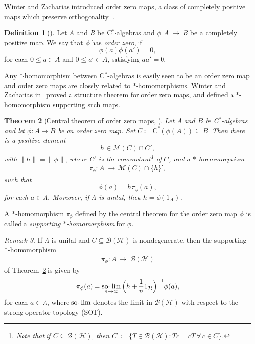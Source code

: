 \documentclass[a4paper]{amsart}
\newcommand{\myhyp}{\textnormal{-}\hskip0pt\relax}
\numberwithin{equation}{section}
\newcommand{\Bcal}{\mathcal{B}}
\newcommand{\Hcal}{\mathcal{H}}
\newcommand{\Mcal}{\mathcal{M}}
\newcommand{\multAlg}[1]{\Mcal({#1})}
\newcommand{\cstar}{C$^\ast$\myhyp{}algebra}
\newcommand{\calg}[1]{\mathrm{C}^\ast({#1})}
\newcommand{\bop}[1]{\Bcal({#1})}
\newcommand{\rAr}{\longrightarrow}
\DeclareMathOperator{\solim}{\mathrm{so\myhyp{}}\lim}
\newcommand{\normreg}[1]{{\lVert #1  \rVert}}
\theoremstyle{plain}
\newtheorem{thm}{Theorem}[section]
\theoremstyle{indented}
\numberwithin{equation}{section}
\theoremstyle{definition}
\newtheorem{defin}[thm]{Definition}
\theoremstyle{remark}
\newtheorem{rmk}[thm]{Remark}
\theoremstyle{plain}
\theoremstyle{definition}
\begin{document}
Winter and Zacharias introduced order zero maps, a class of completely positive maps 
which preserve orthogonality~\cite{WinterZacharias2009orderZero}. 
\begin{defin}[{\cite[Definition~2.3]{WinterZacharias2009orderZero}}]
    Let $A$ and $B$ be \cstar{}s and ${\phi \colon A~\rAr~B}$ be a completely positive map. 
    We say that $\phi$ has \emph{order zero}, if
    \[\phi(a) \phi(a') =0,\]
    for each $0 \le a \in A$ and $0 \le  a' \in A$, satisfying $a a' =0$.
    
\end{defin}

Any $\ast$\myhyp{}homomorphism between \cstar{}s
is easily seen to be an order zero map and 
order zero maps are closely related to $\ast$\myhyp{}homomorphisms. 
Winter and Zacharias in~\cite{WinterZacharias2009orderZero} proved a structure theorem for order zero maps, and defined a $\ast$\myhyp{}homomorphism supporting such maps.

\begin{thm}[Central theorem of order zero maps, {\cite[Theorem~3.3]{WinterZacharias2009orderZero}}] \label{thm:orderZero}
    Let $A$ and $B$ be \cstar{}s and let ${\phi \colon A \rAr B}$ be an order zero map. 
    Set ${C\coloneq \calg{\phi(A)}\subseteq B}$. 
    Then there is a positive element 
    \[h \in \multAlg{C} \cap C',\]
    with ${\normreg{h} = \normreg{\phi}}$,
    where $C'$ is the 
    commutant\footnote{Note that if ${C \subseteq \bop{\Hcal}}$, then ${C' \coloneq \{ T \in \bop{\Hcal} \colon T c = cT  \, \forall \, c \in C\}}$.} 
    of $C$, 
    and a $\ast$\myhyp{}homomorphism
    \begin{align*}
        \pi_\phi \colon A~\rAr~\multAlg{C} \cap \{h\}',
    \end{align*}
    such that
    \begin{equation*}
        \phi(a) = h \pi_\phi (a) ,
    \end{equation*}
    for each $ a \in A$. 
    Moreover, if $A$ is unital, then $h = \phi(1_A)$.
\end{thm}

A $\ast$\myhyp{}homomorphism $\pi_\phi$ defined by the central theorem for the order zero map $\phi$ 
is called a \emph{supporting $\ast$\myhyp{}homomorphism} for $\phi$. 

\begin{rmk} \label{rmk:proofThmOrderZero}
   If $A$ is unital and ${C \subseteq \bop{\Hcal}}$ is nondegenerate, 
  then the supporting $\ast$\myhyp{}homomorphism
    \begin{align*}
        \pi_\phi \colon A~\rAr~\bop{\Hcal}
    \end{align*}
    of Theorem~\ref{thm:orderZero} is
    given by
    \begin{align*}
        \pi_{\phi} (a) = \solim_{n\to \infty} \Big( h + \frac{1}{n} 1_{\Hcal} \Big)^{-1} \phi(a) ,
    \end{align*} for each $a \in A$, where $\solim$ denotes the limit in $\bop{\Hcal}$ with respect to the strong operator topology (SOT).
\end{rmk}
\end{document}
